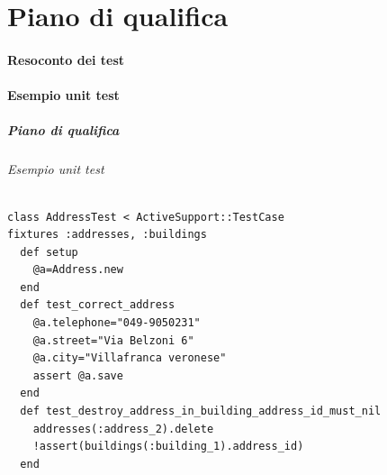 \documentclass[10pt]{beamer}
\begin{document}
\part{Piano di qualifica}
\frame{
	\transsplitverticalin
	\partpage }
\subsection{Resoconto dei test}
\subsection{Esempio unit test}
\begin{frame}[fragile]
  \frametitle{Piano di qualifica}
  \framesubtitle{Esempio unit test}
\begin{small}
\begin{verbatim}
class AddressTest < ActiveSupport::TestCase 
fixtures :addresses, :buildings
  def setup
    @a=Address.new
  end
  def test_correct_address
    @a.telephone="049-9050231"
    @a.street="Via Belzoni 6"
    @a.city="Villafranca veronese"
    assert @a.save
  end
  def test_destroy_address_in_building_address_id_must_nil
    addresses(:address_2).delete
    !assert(buildings(:building_1).address_id)
  end
\end{verbatim} 
\end{small}
\end{frame}
\end{document}
